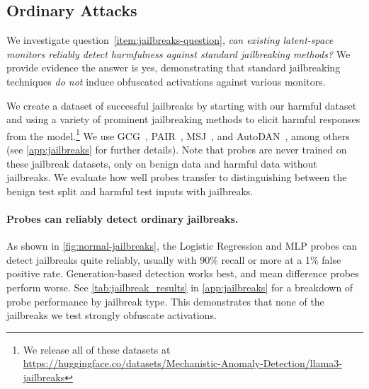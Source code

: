 \documentclass{article}
\begin{document}
\subsection{Ordinary Attacks}
\label{sec:ordinay-jailbreak-attacks}

We investigate question~\ref{item:jailbreaks-question},
\emph{can existing latent-space monitors reliably detect harmfulness against standard jailbreaking methods?}
We provide evidence the answer is yes, 
demonstrating that standard jailbreaking techniques 
\emph{do not} induce obfuscated activations
against various monitors.

We create a dataset of successful jailbreaks by
starting with our harmful dataset and using a
variety of prominent jailbreaking methods to
elicit harmful responses from the
model.\footnote{We release all of 
these datasets at \url{https://huggingface.co/datasets/Mechanistic-Anomaly-Detection/llama3-jailbreaks}} We use GCG~\citep{zou2023universal}, PAIR~\citep{chao2023jailbreaking}, MSJ~\citep{anil2024many}, and AutoDAN~\citep{liu2023autodan}, among others 
(see \cref{app:jailbreaks} for further details).
Note that probes are never trained on these jailbreak
datasets, only on benign data and harmful data 
without jailbreaks. We evaluate how
well probes transfer to distinguishing between
the benign test split and harmful test inputs with jailbreaks.

\paragraph{Probes can reliably detect ordinary jailbreaks.} 
As shown in \cref{fig:normal-jailbreaks}, the Logistic Regression 
and MLP probes can detect jailbreaks quite reliably, usually with
90\% recall or more at a 1\% false positive rate. Generation-based
detection works best, and mean difference probes perform worse.
See \cref{tab:jailbreak_results} in \cref{app:jailbreaks} for a breakdown of probe performance by jailbreak type.
This demonstrates that none of the jailbreaks we test strongly obfuscate activations.
\end{document}
